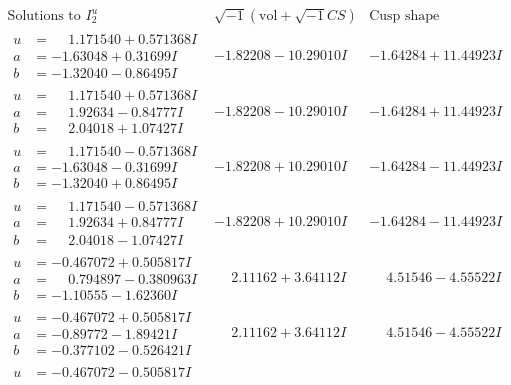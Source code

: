 \documentclass[1p]{elsarticle_modified}
\theoremstyle{definition}
\newcommand{\I}{\sqrt{-1}}
\begin{document}
$$\begin{array}{c|c|c}
\text{Solutions to }I^u_{2}& \I (\text{vol} + \sqrt{-1}CS) & \text{Cusp shape}\\
 \hline 
\begin{aligned}
u &= \phantom{-}1.171540 + 0.571368 I \\
a &= -1.63048 + 0.31699 I \\
b &= -1.32040 - 0.86495 I\end{aligned}
 & -1.82208 - 10.29010 I & -1.64284 + 11.44923 I \\ \hline\begin{aligned}
u &= \phantom{-}1.171540 + 0.571368 I \\
a &= \phantom{-}1.92634 - 0.84777 I \\
b &= \phantom{-}2.04018 + 1.07427 I\end{aligned}
 & -1.82208 - 10.29010 I & -1.64284 + 11.44923 I \\ \hline\begin{aligned}
u &= \phantom{-}1.171540 - 0.571368 I \\
a &= -1.63048 - 0.31699 I \\
b &= -1.32040 + 0.86495 I\end{aligned}
 & -1.82208 + 10.29010 I & -1.64284 - 11.44923 I \\ \hline\begin{aligned}
u &= \phantom{-}1.171540 - 0.571368 I \\
a &= \phantom{-}1.92634 + 0.84777 I \\
b &= \phantom{-}2.04018 - 1.07427 I\end{aligned}
 & -1.82208 + 10.29010 I & -1.64284 - 11.44923 I \\ \hline\begin{aligned}
u &= -0.467072 + 0.505817 I \\
a &= \phantom{-}0.794897 - 0.380963 I \\
b &= -1.10555 - 1.62360 I\end{aligned}
 & \phantom{-}2.11162 + 3.64112 I & \phantom{-}4.51546 - 4.55522 I \\ \hline\begin{aligned}
u &= -0.467072 + 0.505817 I \\
a &= -0.89772 - 1.89421 I \\
b &= -0.377102 - 0.526421 I\end{aligned}
 & \phantom{-}2.11162 + 3.64112 I & \phantom{-}4.51546 - 4.55522 I \\ \hline\begin{aligned}
u &= -0.467072 - 0.505817 I \\

\end{aligned}
\end{array}$$
\end{document}
